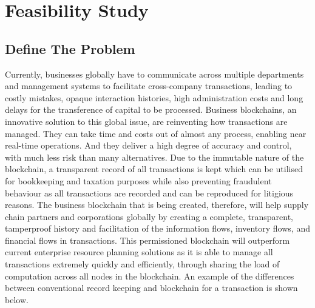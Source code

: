 \let\textcircled=\pgftextcircled
\chapter{Feasibility Study}
\section{Define The Problem}

Currently, businesses globally have to communicate across multiple departments and management systems to facilitate cross-company transactions, leading to costly mistakes, opaque interaction histories, high administration costs and long delays for the transference of capital to be processed. Business blockchains, an innovative solution to this global issue, are reinventing how transactions are managed. They can take time and costs out of almost any process, enabling near real-time operations. And they deliver a high degree of accuracy and control, with much less risk than many alternatives. Due to the immutable nature of the blockchain, a transparent record of all transactions is kept which can be utilised for bookkeeping and taxation purposes while also preventing fraudulent behaviour as all transactions are recorded and can be reproduced for litigious reasons. The business blockchain that is being created, therefore, will help supply chain partners and corporations globally by creating a complete, transparent, tamperproof history and facilitation of the information flows, inventory flows, and financial flows in transactions. This permissioned blockchain will outperform current enterprise resource planning solutions as it is able to manage all transactions extremely quickly and efficiently, through sharing the load of computation across all nodes in the blockchain. An example of the differences between conventional record keeping and blockchain for a transaction is shown below. \\

